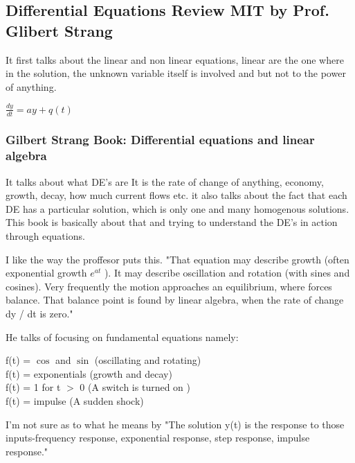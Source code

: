 \documentclass[12pt]{article}
\begin{document}
\subsection*{Differential Equations Review MIT by Prof. Glibert Strang}
It first talks about the linear and non linear equations, linear are the one where in the solution,
the unknown variable itself is involved and but not to the power of anything. 

\begin{center}
    $\frac{dy}{dt} = ay + q(t) $
\end{center}

\subsubsection*{Gilbert Strang Book: Differential equations and linear algebra}
It talks about what DE's are 
It is the rate of change of anything, economy, growth, decay, how much current flows etc. it also talks about the fact that 
each DE has a particular solution, which is only one and many homogenous solutions. This book is basically about that and trying to understand the DE's in action through equations. 

I like the way the proffesor puts this. "That equation may describe growth (often exponential growth $e^{at}$ ). It may describe
oscillation and rotation (with sines and cosines). Very frequently the motion approaches an
equilibrium, where forces balance. That balance point is found by linear algebra, when the
rate of change dy / dt is zero." 

He talks of focusing on fundamental equations namely:
\begin{center}
    f(t) = $\cos$ and $\sin$    (oscillating and rotating)
    \\f(t) = exponentials     (growth and decay)\\
    f(t) = 1 for t $>$ 0        (A switch is turned on )\\
    f(t) = impulse           (A sudden shock)\\   
\end{center}

I'm not sure as to what he means by "The solution y(t) is the response to those inputs-frequency response, exponential response, step response, impulse response."
\end{document}
